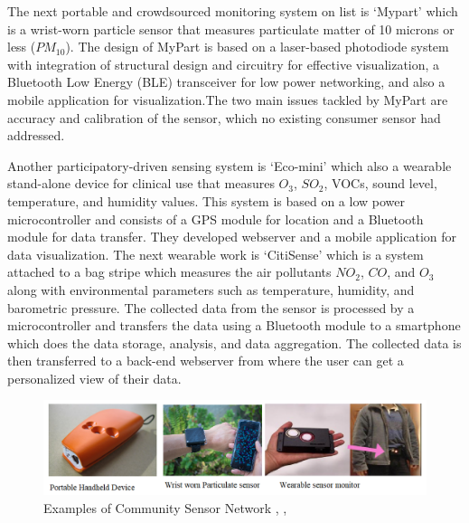The next portable and crowdsourced monitoring system on list is \lq{Mypart}\rq \cite{Tian2016} which is a wrist-worn particle sensor that measures particulate matter of 10 microns or less ($PM_{10}$). The design of MyPart is based on a laser-based photodiode system with integration of structural design and circuitry for effective visualization, a Bluetooth Low Energy (BLE) transceiver for low power networking, and also a mobile application for visualization.The two main issues tackled by MyPart are accuracy and calibration of the sensor, which no existing consumer sensor had addressed.



Another participatory-driven sensing system is \lq{Eco-mini}\rq \cite{Fletcher2015} which also a wearable stand-alone device for clinical use that measures $O_{3}$, $SO_{2}$, VOCs, sound level, temperature, and humidity values. This system is based on a low power microcontroller and consists of a GPS module for location and a Bluetooth module for data transfer. They developed  webserver and a mobile application for data visualization. The next wearable work is \lq{CitiSense}\rq \cite{Zappi2012} which is a system attached to a bag stripe which measures the air pollutants $NO_{2}$, $CO$, and $O_{3}$ along with environmental parameters such as temperature, humidity, and barometric pressure. The collected data from the sensor is processed by a microcontroller and transfers the data using a Bluetooth module to a smartphone which does the data storage, analysis, and data aggregation. The collected data is then transferred to a back-end webserver from where the user can get a personalized view of their data.




\begin{figure}[h!]
  \begin{center}
  \includegraphics[scale=0.80]{./images/figure41.png}
  \end{center}
 
  \caption{Examples of Community Sensor Network \cite{Tian2016}, \cite{Dutta2009}, \cite{Fletcher2015} }
  
  \label{CSN}
\end{figure}
 
